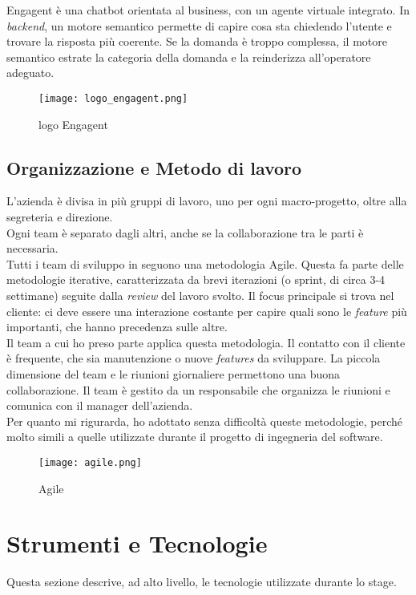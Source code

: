 Engagent è una chatbot orientata al business, con un agente virtuale integrato. In \textit{backend}, un motore semantico permette di capire cosa sta chiedendo l'utente e trovare la risposta più coerente. Se la domanda è troppo complessa, il motore semantico estrate la categoria della domanda e la reinderizza all'operatore adeguato.
\begin{figure}[H]
    \centering
    \texttt{[image: logo\_engagent.png]} 
    \caption{logo Engagent}
    \label{logo:company}
\end{figure}
\subsection{Organizzazione e Metodo di lavoro}
L'azienda è divisa in più gruppi di lavoro, uno per ogni macro-progetto, oltre alla segreteria e direzione.\\
Ogni team è separato dagli altri, anche se la collaborazione tra le parti è necessaria.\\
Tutti i team di sviluppo in \company seguono una metodologia Agile. Questa fa parte delle metodologie iterative, caratterizzata da brevi iterazioni (o sprint, di circa 3-4 settimane) seguite dalla \textit{review} del lavoro svolto. Il focus principale si trova nel cliente: ci deve essere una interazione costante per capire quali sono le \textit{feature} più importanti, che hanno precedenza sulle altre.\\
Il team a cui ho preso parte applica questa metodologia. Il contatto con il cliente è frequente, che sia manutenzione o nuove \textit{features} da sviluppare. La piccola dimensione del team e le riunioni giornaliere permettono una buona collaborazione. Il team è gestito da un responsabile che organizza le riunioni e comunica con il manager dell'azienda.\\
Per quanto mi rigurarda, ho adottato senza difficoltà queste metodologie, perché molto simili a quelle utilizzate durante il progetto di ingegneria del software.
\begin{figure}[H]
    \centering
    \texttt{[image: agile.png]} 
    \caption{Agile}
    \label{logo:company}
\end{figure}

\section{Strumenti e Tecnologie}
Questa sezione descrive, ad alto livello, le tecnologie utilizzate durante lo stage.
